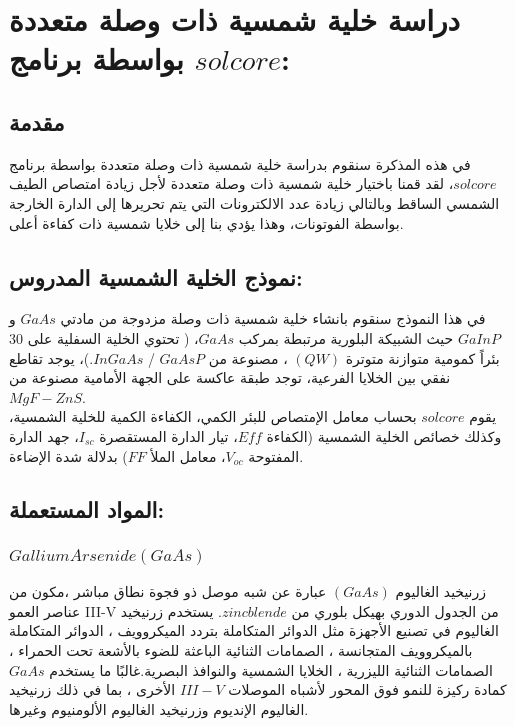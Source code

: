 \chapter{دراسة خلية شمسية ذات وصلة متعددة بواسطة برنامج $ solcore  $: } %

\label{Chapter3} %




\section{مقدمة}
في هذه المذكرة سنقوم بدراسة خلية شمسية ذات وصلة متعددة بواسطة برنامج $ solcore $، لقد قمنا باختيار خلية شمسية ذات وصلة متعددة لأجل زيادة امتصاص الطيف الشمسي الساقط وبالتالي زيادة عدد الالكترونات التي يتم تحريرها إلى الدارة الخارجة بواسطة الفوتونات، وهذا يؤدي بنا إلى خلايا شمسية ذات كفاءة أعلى. 

\section{نموذج الخلية الشمسية المدروس:}
في هذا النموذج سنقوم بانشاء خلية شمسية ذات وصلة مزدوجة من مادتي $ GaAs $ و $ GaInP $ حيث الشبيكة البلورية مرتبطة بمركب $ GaAs $، ( تحتوي الخلية السفلية على 30 بئراً كمومية متوازنة متوترة $ (QW) $ ، مصنوعة من $ GaAsP $ / $ InGaAs $.)، يوجد تقاطع نفقي بين الخلايا الفرعية، توجد طبقة عاكسة على الجهة الأمامية مصنوعة من $ MgF-ZnS $.
\\
يقوم $ solcore $ بحساب معامل الإمتصاص للبئر الكمي، الكفاءة الكمية للخلية الشمسية، وكذلك خصائص الخلية الشمسية (الكفاءة $ Eff $، تيار الدارة المستقصرة $ I_{sc} $، جهد الدارة المفتوحة $ V_{oc} $، معامل الملأ $ FF $) بدلالة شدة الإضاءة.
\section{المواد المستعملة:}
\subsection{$ Gallium Arsenide (GaAs) $}
زرنيخيد الغاليوم $ (GaAs) $ عبارة عن شبه موصل ذو فجوة نطاق مباشر ،مكون من عناصر العمو III-V من الجدول الدوري بهيكل بلوري من $ zinc blende $. يستخدم زرنيخيد الغاليوم في تصنيع الأجهزة مثل الدوائر المتكاملة بتردد الميكروويف ، الدوائر المتكاملة بالميكروويف المتجانسة ، الصمامات الثنائية الباعثة للضوء بالأشعة تحت الحمراء ، الصمامات الثنائية الليزرية ، الخلايا الشمسية والنوافذ البصرية.غالبًا ما يستخدم $ GaAs  $ كمادة ركيزة للنمو فوق المحور لأشباه الموصلات $ III-V $ الأخرى ، بما في ذلك زرنيخيد الغاليوم الإنديوم وزرنيخيد الغاليوم الألومنيوم وغيرها.

